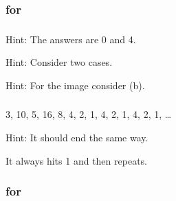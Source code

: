 \subsubsection{\answers for  \subpiecewise}

\subsubsection*{ \answers}
\begin{apart}
    \item Hint: The answers are 0 and 4.
    \item Hint: Consider two cases.
    \item Hint: For the image consider (b). 
\end{apart}

\subsubsection*{ \answers}
\begin{apart}
    \item 3, 10, 5, 16, 8, 4, 2, 1, 4, 2, 1, 4, 2, 1, \ldots
    \item Hint: It should end the same way.
    \item It always hits 1 and then repeats.
\end{apart}

\subsubsection{\answers for  \subfndotgraphs}

